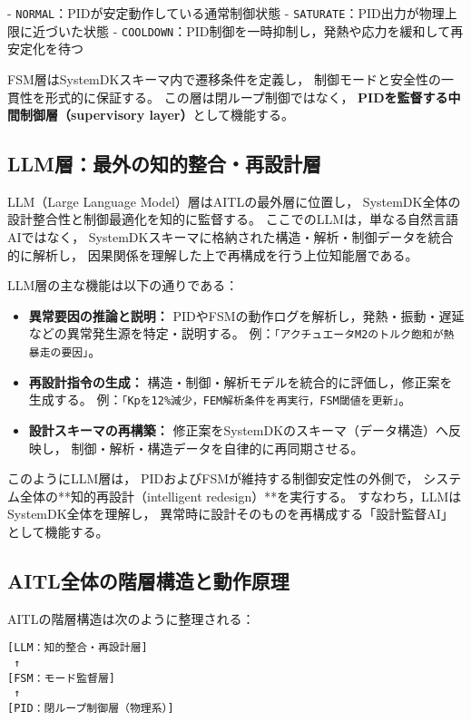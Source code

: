 - \texttt{NORMAL}：PIDが安定動作している通常制御状態  
- \texttt{SATURATE}：PID出力が物理上限に近づいた状態  
- \texttt{COOLDOWN}：PID制御を一時抑制し，発熱や応力を緩和して再安定化を待つ  

FSM層はSystemDKスキーマ内で遷移条件を定義し，
制御モードと安全性の一貫性を形式的に保証する。
この層は閉ループ制御ではなく，
\textbf{PIDを監督する中間制御層（supervisory layer）}として機能する。

\subsection{LLM層：最外の知的整合・再設計層}
LLM（Large Language Model）層はAITLの最外層に位置し，
SystemDK全体の設計整合性と制御最適化を知的に監督する。
ここでのLLMは，単なる自然言語AIではなく，
SystemDKスキーマに格納された構造・解析・制御データを統合的に解析し，
因果関係を理解した上で再構成を行う上位知能層である。

LLM層の主な機能は以下の通りである：

\begin{itemize}
  \item \textbf{異常要因の推論と説明：}  
  PIDやFSMの動作ログを解析し，発熱・振動・遅延などの異常発生源を特定・説明する。  
  例：\texttt{「アクチュエータM2のトルク飽和が熱暴走の要因」}。

  \item \textbf{再設計指令の生成：}  
  構造・制御・解析モデルを統合的に評価し，修正案を生成する。  
  例：\texttt{「Kpを12\%減少，FEM解析条件を再実行，FSM閾値を更新」}。

  \item \textbf{設計スキーマの再構築：}  
  修正案をSystemDKのスキーマ（データ構造）へ反映し，
  制御・解析・構造データを自律的に再同期させる。
\end{itemize}

このようにLLM層は，
PIDおよびFSMが維持する制御安定性の外側で，
システム全体の**知的再設計（intelligent redesign）**を実行する。
すなわち，LLMはSystemDK全体を理解し，
異常時に設計そのものを再構成する「設計監督AI」として機能する。

\subsection{AITL全体の階層構造と動作原理}
AITLの階層構造は次のように整理される：

\begin{center}
\texttt{[LLM：知的整合・再設計層]}\\
\texttt{     ↑}\\
\texttt{[FSM：モード監督層]}\\
\texttt{     ↑}\\
\texttt{[PID：閉ループ制御層（物理系）]}
\end{center}

